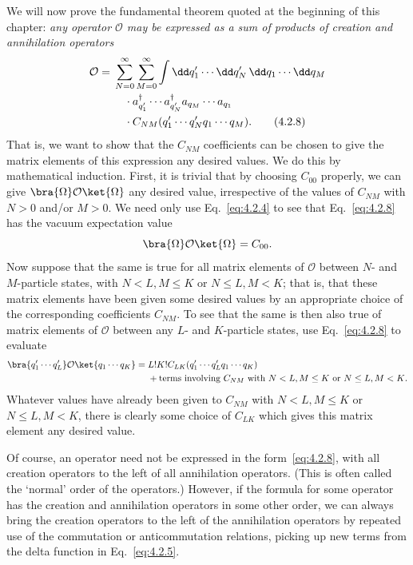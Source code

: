 We will now prove the fundamental theorem quoted at the beginning
of this chapter: \textit{any operator $\mathcal O$ may be expressed as a sum of products of
creation and annihilation operators}
\begin{align}
  \mathcal O={}&\sum_{N=0}^{\infty}\sum_{M=0}^{\infty}
  \int \dd q'_1\cdots \dd q'_N\,\dd q_1\cdots \dd q_M
  \notag\\
  &\quad\cdot a^\dagger_{q'_1}\cdots a^\dagger_{q'_N}
  a_{q_M}\cdots a_{q_1}
  \notag\\
  &\quad\cdot C_{NM}(q'_1\cdots q'_N q_1\cdots q_M).
  \tag{4.2.8}
  \label{eq:4.2.8}
\end{align}
That is, we want to show that the $C_{NM}$ coefficients can be chosen to give
the matrix elements of this expression any desired values. We do this by
mathematical induction. First, it is trivial that by choosing $C_{00}$ properly,
we can give $\bra{\Omega}\mathcal O\ket{\Omega}$ any desired value, irrespective of the values of $C_{NM}$
with $N>0$ and/or $M>0$. We need only use Eq.~\eqref{eq:4.2.4} to see that
Eq.~\eqref{eq:4.2.8} has the vacuum expectation value
\[
  \bra{\Omega}\mathcal O\ket{\Omega}=C_{00}.
\]
Now suppose that the same is true for all matrix elements of $\mathcal O$ between
$N$- and $M$-particle states, with $N<L,M\leq K$ or $N\leq L,M<K$; that
is, that these matrix elements have been given some desired values by
an appropriate choice of the corresponding coefficients $C_{NM}$. To see that
the same is then also true of matrix elements of $\mathcal O$ between any $L$- and
$K$-particle states, use Eq.~\eqref{eq:4.2.8} to evaluate
\begin{align*}
  \bra{q'_1\cdots q'_L}\mathcal O\ket{q_1\cdots q_K}
  ={}& L!K!C_{LK}(q'_1\cdots q'_L q_1\cdots q_K)
  \\
  &+\text{terms involving $C_{NM}$ with $N<L,M\leq K$ or $N\leq L,M<K$.}
\end{align*}
Whatever values have already been given to $C_{NM}$ with $N<L,M\leq K$
or $N\leq L,M<K$, there is clearly some choice of $C_{LK}$ which gives this
matrix element any desired value.

Of course, an operator need not be expressed in the form~\eqref{eq:4.2.8}, with
all creation operators to the left of all annihilation operators. (This
is often called the `normal' order of the operators.) However, if the
formula for some operator has the creation and annihilation operators
in some other order, we can always bring the creation operators to the
left of the annihilation operators by repeated use of the commutation or
anticommutation relations, picking up new terms from the delta function
in Eq.~\eqref{eq:4.2.5}.

